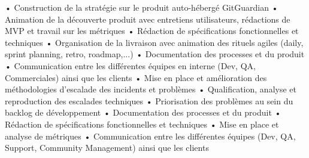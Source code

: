 \documentclass[
	a4paper,
]{fortysecondscv}
\begin{document}
\makefrontsidebar

\begin{cvtable}[3]
        {
			• Construction de la stratégie sur le produit auto-hébergé 
			GitGuardian\newline
			• Animation de la découverte produit avec entretiens utilisateurs,
			rédactions de MVP et travail sur les métriques\newline
			• Rédaction de spécifications fonctionnelles et techniques\newline
			• Organisation de la livraison avec animation des rituels agiles
			(daily, sprint planning, retro, roadmap,...)\newline
			• Documentation des processes et du produit\newline
			• Communication entre les différentes équipes en interne (Dev, QA, Commerciales) ainsi que les clients\newline
		}
        {
            • Mise en place et amélioration des méthodologies d'escalade des
            incidents et problèmes\newline
            • Qualification, analyse et reproduction des escalades techniques
            \newline
            • Priorisation des problèmes au sein du backlog de développement
            \newline
            • Documentation des processes et du produit\newline
            • Rédaction de spécifications fonctionnelles et techniques\newline
            • Mise en place et analyse de métriques\newline
            • Communication entre les différentes équipes (Dev, QA, Support, Community Management) ainsi que les clients\newline
        }


\end{cvtable}
\end{document}
